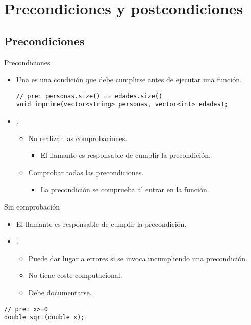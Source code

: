 \section{Precondiciones y postcondiciones}

\subsection{Precondiciones}

\begin{frame}[t,fragile]{Precondiciones}
\begin{itemize}
  \item Una  es una condición que debe cumplirse
        antes de ejecutar una función.
\begin{lstlisting}
// pre: personas.size() == edades.size()
void imprime(vector<string> personas, vector<int> edades);
\end{lstlisting}

  \item {}:
    \begin{itemize}

      \item No realizar las comprobaciones.
        \begin{itemize}
          \item El llamante es responsable de cumplir la precondición.
        \end{itemize}

      \item Comprobar todas las precondiciones.
        \begin{itemize}
          \item La precondición se comprueba al entrar en la función.
        \end{itemize}
    \end{itemize}
\end{itemize}
\end{frame}

\begin{frame}[t,fragile]{Sin comprobación}
\begin{itemize}
  \item El llamante es responsable de cumplir la precondición.


  \item {}:
    \begin{itemize}
      \item Puede dar lugar a errores si se invoca incumpliendo
            una precondición.
      \item No tiene coste computacional.
      \item Debe documentarse.
    \end{itemize}
\end{itemize}


\begin{lstlisting}
// pre: x>=0
double sqrt(double x);
\end{lstlisting}
\end{frame}

